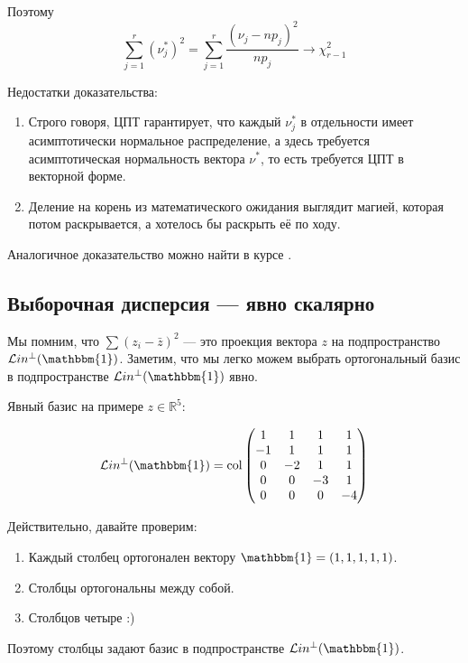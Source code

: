 \documentclass[11pt,russian,]{article}
\newcommand{\RR}{\mathbb{R}}
\newcommand{\1}{\mathbbm{1}}
\newcommand{\Lin}{\mathcal{L}in}
\newcommand{\Linp}{\Lin^{\perp}}
\newcommand{\col}{\mathcal{col}}
\renewcommand{\col}{\mathrm{col}}
\begin{document}
Поэтому \[
\sum_{j=1}^r (\nu_j^*)^2 = \sum_{j=1}^r \frac{(\nu_j - np_j)^2}{np_j} \to \chi^2_{r-1}
\]

Недостатки доказательства:

\begin{enumerate}
\def\labelenumi{\arabic{enumi}.}
\item
  Строго говоря, ЦПТ гарантирует, что каждый \(\nu_j^*\) в отдельности
  имеет асимптотически нормальное распределение, а здесь требуется
  асимптотическая нормальность вектора \(\nu^*\), то есть требуется ЦПТ
  в векторной форме.
\item
  Деление на корень из математического ожидания выглядит магией, которая
  потом раскрывается, а хотелось бы раскрыть её по ходу.
\end{enumerate}

Аналогичное доказательство можно найти в курсе
\textcite{panchenko2005statistics}.

\subsection{Выборочная дисперсия --- явно скалярно}\label{---}

Мы помним, что \(\sum (z_i - \bar z)^2\) --- это проекция вектора \(z\)
на подпространство \(\Linp (\1)\). Заметим, что мы легко можем выбрать
ортогональный базис в подпространстве \(\Linp (\1)\) явно.

Явный базис на примере \(z \in \RR^{5}\):

\[
\Linp (\1) = \col \begin{pmatrix}
1  & 1  & 1  & 1  \\ 
-1 & 1  & 1  & 1  \\
0  & -2 & 1  & 1  \\
0  & 0  & -3 & 1  \\
0  & 0  & 0  & -4  \\
\end{pmatrix}
\]

Действительно, давайте проверим:

\begin{enumerate}
\def\labelenumi{\arabic{enumi}.}
\item
  Каждый столбец ортогонален вектору \(\1 = (1, 1, 1, 1, 1)\).
\item
  Столбцы ортогональны между собой.
\item
  Столбцов четыре :)
\end{enumerate}

Поэтому столбцы задают базис в подпространстве \(\Linp (\1)\).
\end{document}
